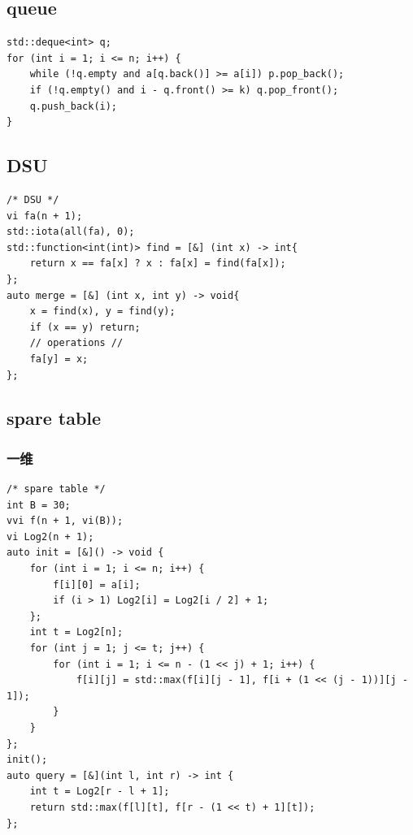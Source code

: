 \documentclass[UTF8, a4paper, titlepage, twoside]{ctexart}
\begin{document}
\subsection{ queue }
\begin{lstlisting}[style=cpp]
std::deque<int> q;
for (int i = 1; i <= n; i++) {    
    while (!q.empty and a[q.back()] >= a[i]) p.pop_back();
    if (!q.empty() and i - q.front() >= k) q.pop_front();
    q.push_back(i);
}
\end{lstlisting}

\subsection{ DSU }
\begin{lstlisting}[style=cpp]
/* DSU */
vi fa(n + 1);
std::iota(all(fa), 0);
std::function<int(int)> find = [&] (int x) -> int{
    return x == fa[x] ? x : fa[x] = find(fa[x]);
};
auto merge = [&] (int x, int y) -> void{
    x = find(x), y = find(y);
    if (x == y) return;
    // operations //
    fa[y] = x;
};
\end{lstlisting}

\subsection{ spare table }

\subsubsection*{ 一维 }
\begin{lstlisting}[style=cpp]
/* spare table */
int B = 30;
vvi f(n + 1, vi(B));
vi Log2(n + 1);
auto init = [&]() -> void {
    for (int i = 1; i <= n; i++) {
        f[i][0] = a[i];
        if (i > 1) Log2[i] = Log2[i / 2] + 1;
    };
    int t = Log2[n];
    for (int j = 1; j <= t; j++) {
        for (int i = 1; i <= n - (1 << j) + 1; i++) {
            f[i][j] = std::max(f[i][j - 1], f[i + (1 << (j - 1))][j - 1]);
        }
    }
};
init();
auto query = [&](int l, int r) -> int {
    int t = Log2[r - l + 1];
    return std::max(f[l][t], f[r - (1 << t) + 1][t]);
};\end{lstlisting}
\end{document}

